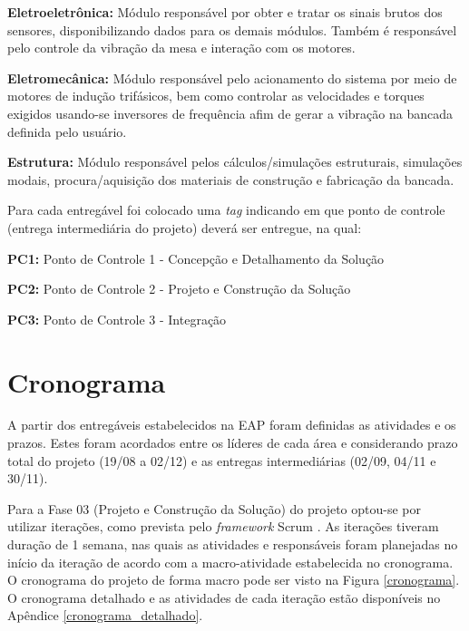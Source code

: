 \textbf{Eletroeletrônica:} Módulo responsável por obter e tratar os sinais brutos dos sensores, disponibilizando dados para os demais módulos. Também é responsável pelo controle da vibração da mesa e interação com os motores.

\textbf{Eletromecânica:} Módulo responsável pelo acionamento do sistema por meio de motores de indução trifásicos, bem como controlar as velocidades e torques exigidos usando-se inversores de frequência afim de gerar a vibração na bancada definida pelo usuário.

\textbf{Estrutura:} Módulo responsável pelos cálculos/simulações estruturais, simulações modais, procura/aquisição dos materiais de construção e fabricação da bancada.

Para cada entregável foi colocado uma \textit{tag} indicando em que ponto de controle (entrega intermediária do projeto) deverá ser entregue, na qual:

\indent \textbf{PC1:} Ponto de Controle 1 - Concepção e Detalhamento da Solução

\indent \textbf{PC2:} Ponto de Controle 2 - Projeto e Construção da Solução

\indent \textbf{PC3:} Ponto de Controle 3 - Integração

\section*{Cronograma}

A partir dos entregáveis estabelecidos na EAP foram definidas as atividades e os prazos. Estes foram acordados entre os líderes de cada área e considerando prazo total do projeto (19/08 a 02/12) e as entregas intermediárias (02/09, 04/11 e 30/11).

Para a Fase 03 (Projeto e Construção da Solução) do projeto optou-se por utilizar iterações, como prevista pelo 
\textit{framework} Scrum \cite{scrum}.
As iterações tiveram duração de 1 semana, 
nas quais as atividades e responsáveis foram planejadas no início da iteração de acordo 
com a macro-atividade estabelecida no cronograma.
O cronograma do projeto de forma macro pode ser visto na Figura \ref{cronograma}. O cronograma detalhado 
e as atividades de cada iteração estão disponíveis no Apêndice \ref{cronograma_detalhado}. 

